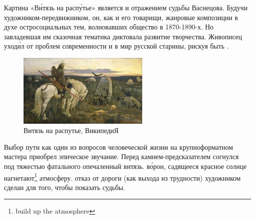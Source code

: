 Картина «В\'{и}тязь на расп\'{у}тье»  является и отражением судьбы Васнецова.
Будучи  художником-передвижником, он, как и его товарищи,  жанровые композиции в духе остросоциальных тем, волновавших общество в 1870-1890-х.
Но завладевшая им сказочная тематика диктовала  развитие творчества. Живописец уход\'{и}л от проблем современности и  в мир русской старины, рискуя быть .

\begin{figure}
    \begin{center}
        \includegraphics[width=0.57\textwidth]{img/TheKnightAtTheCrossroads.jpg}
    \end{center}
    \caption{Витязь на распутье, ВикипедиЯ}
\end{figure}
Выбор пути как один из  вопросов человеческой жизни на крупноформатном  мастера приобрел эпическое звучание.
Перед камнем-предсказателем согнулся под тяжестью фатального  опечаленный витязь.  в\'{о}рон, садящееся красное солнце нагнетают\footnote{build up the atmosphere} атмосферу.  отказ от  дороги (как выхода из трудности) художником сделан для того, чтобы показать  судьбы.


\clearpage


